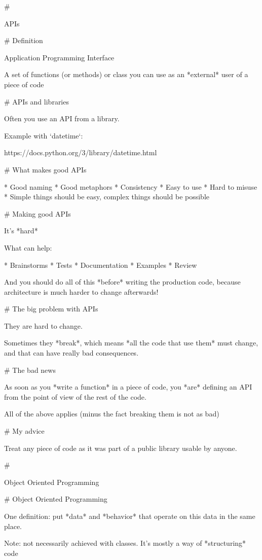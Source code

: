 #

\huge \center APIs


# Definition

Application Programming Interface

A set of functions (or methods) or class you can use
as an *external* user of a piece of code

# APIs and libraries

Often you use an API from a library.

Example with `datetime`:

https://docs.python.org/3/library/datetime.html

# What makes good APIs

* Good naming
* Good metaphors
* Consistency
* Easy to use
* Hard to misuse
* Simple things should be easy, complex things should be possible

# Making good APIs

It's *hard*

What can help:

* Brainstorms
* Tests
* Documentation
* Examples
* Review

And you should do all  of this *before* writing the production code, because
architecture is much harder to change afterwards!

# The big problem with APIs

They are hard to change.

Sometimes they *break*, which means *all the code that use them* must change,
and that can have really bad consequences.

# The bad news

As soon as you *write a function* in a piece of code, you *are* defining
an API from the point of view of the rest of the code.

All of the above applies (minus the fact breaking them is not as bad)

# My advice

Treat any piece of code as it was part of a public library usable by anyone.

#

\huge \center Object Oriented Programming

# Object Oriented Programming

One definition: put *data* and *behavior* that operate on this data in
the same place.


Note: not necessarily achieved with classes. It's mostly a way
of *structuring* code


